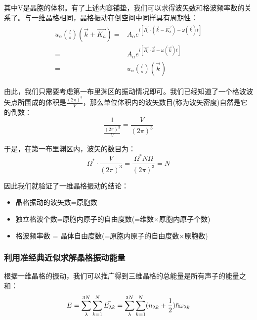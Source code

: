 \documentclass{ctexart}
\begin{document}
                其中V是晶胞的体积。有了上述内容铺垫，我们可以求得波矢数和格波频率数的关系了。与一维晶格相同，晶格振动在倒空间中同样具有周期性：
                \begin{align}
                    \begin{split}
                        u_\alpha\binom{l}{s}(\vec{k}+\vec{K_h})=&A_\alpha e^{i[\vec{R_l}\cdot(\vec{k}-\vec{K_h})-\omega(\vec{k})t]}\\
                        =&A_\alpha e^{i[\vec{R_l}\cdot\vec{k}-\omega(\vec{k})t]}\\
                        =&u_\alpha\binom{l}{s}(\vec{k})
                    \end{split}
                \end{align}
                
                由此，我们只需要考虑第一布里渊区的振动情况即可。我们已经知道了一个格波波矢点所围成的体积是$\frac{(2\pi)^3}{V}$，那么单位体积内的波矢数目(称为波矢密度)自然是它的倒数：
                \begin{equation}
                    \frac{1}{\frac{(2\pi)^3}{V}}=\frac{V}{(2\pi)^3}
                \end{equation}

                于是，在第一布里渊区内，波矢的数目为：
                \begin{equation}
                     \Omega^*\cdot\frac{V}{(2\pi)^3}=\frac{\Omega^*N\Omega}{(2\pi)^3}=N
                \end{equation}
                
                因此我们就验证了一维晶格振动的结论：
                \begin{itemize}
                    \item 晶格振动的波矢数=原胞数
                    \item 独立格波个数=原胞内原子的自由度数(=维数$\times$原胞内原子个数)
                    \item 格波频率数 = 晶体自由度数(=原胞内原子的自由度数$\times$原胞数)
                \end{itemize}
                
                \subsubsection{利用准经典近似求解晶格振动能量}
                根据一维晶格的振动，我们可以推广得到三维晶格的总能量是所有声子的能量之和：
                \begin{equation}
                    E=\sum_\lambda^{3N}\sum_{k=1}^N\Bar{E_{\lambda k}}=\sum_\lambda^{3N}\sum_{k=1}^N(n_{\lambda k}+\frac{1}{2})\hbar\omega_{\lambda k}
                \end{equation}
                
\end{document}

